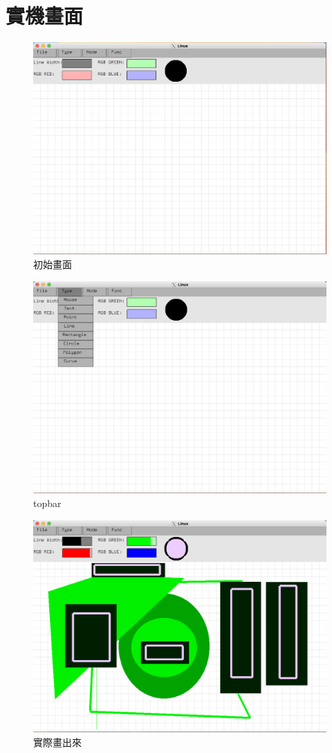 \documentclass[a4,12pt]{article}
\begin{document}
    \section{實機畫面}
    \begin{figure}[H] 
    \centering
    
    \includegraphics[scale = 0.3]{full.png}
    \caption{初始畫面}
    \end{figure}
    \begin{figure}[H] 
        \centering
       
    \includegraphics[scale = 0.3]{menubar.png}
    \caption{topbar}
    \end{figure}
    \begin{figure}[H] 
        \centering
       
    \includegraphics[scale = 0.3]{draw.png}
    \caption{實際畫出來}
\end{figure}
    
\end{document}
